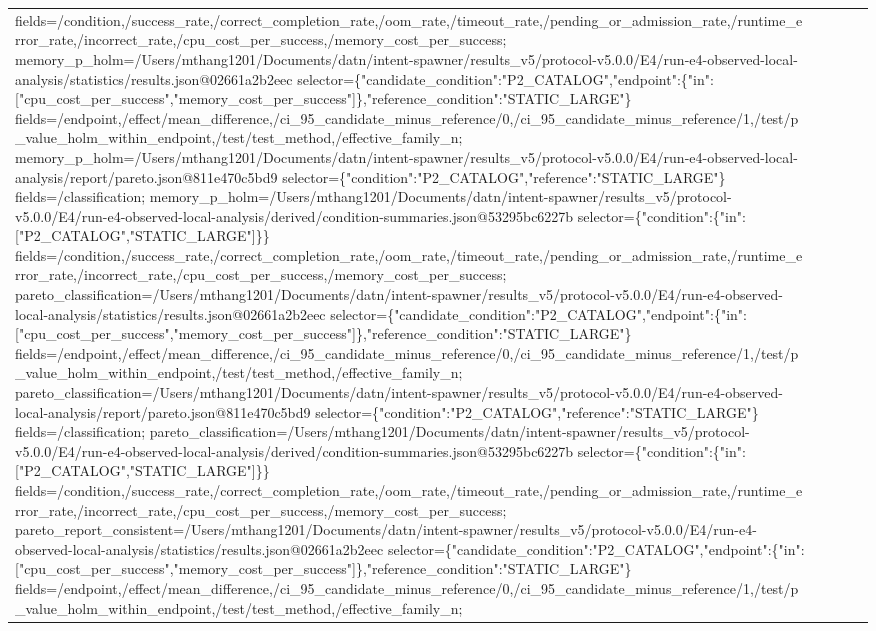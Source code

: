 \begin{tabular}{lllll}
fields=/condition,/success\_rate,/correct\_completion\_rate,/oom\_rate,/timeout\_rate,/pending\_or\_admission\_rate,/runtime\_error\_rate,/incorrect\_rate,/cpu\_cost\_per\_success,/memory\_cost\_per\_success; memory\_p\_holm=/Users/mthang1201/Documents/datn/intent-spawner/results\_v5/protocol-v5.0.0/E4/run-e4-observed-local-analysis/statistics/results.json@02661a2b2eec selector=\{"candidate\_condition":"P2\_CATALOG","endpoint":\{"in":["cpu\_cost\_per\_success","memory\_cost\_per\_success"]\},"reference\_condition":"STATIC\_LARGE"\} fields=/endpoint,/effect/mean\_difference,/ci\_95\_candidate\_minus\_reference/0,/ci\_95\_candidate\_minus\_reference/1,/test/p\_value\_holm\_within\_endpoint,/test/test\_method,/effective\_family\_n; memory\_p\_holm=/Users/mthang1201/Documents/datn/intent-spawner/results\_v5/protocol-v5.0.0/E4/run-e4-observed-local-analysis/report/pareto.json@811e470c5bd9 selector=\{"condition":"P2\_CATALOG","reference":"STATIC\_LARGE"\} fields=/classification; memory\_p\_holm=/Users/mthang1201/Documents/datn/intent-spawner/results\_v5/protocol-v5.0.0/E4/run-e4-observed-local-analysis/derived/condition-summaries.json@53295bc6227b selector=\{"condition":\{"in":["P2\_CATALOG","STATIC\_LARGE"]\}\} fields=/condition,/success\_rate,/correct\_completion\_rate,/oom\_rate,/timeout\_rate,/pending\_or\_admission\_rate,/runtime\_error\_rate,/incorrect\_rate,/cpu\_cost\_per\_success,/memory\_cost\_per\_success; pareto\_classification=/Users/mthang1201/Documents/datn/intent-spawner/results\_v5/protocol-v5.0.0/E4/run-e4-observed-local-analysis/statistics/results.json@02661a2b2eec selector=\{"candidate\_condition":"P2\_CATALOG","endpoint":\{"in":["cpu\_cost\_per\_success","memory\_cost\_per\_success"]\},"reference\_condition":"STATIC\_LARGE"\} fields=/endpoint,/effect/mean\_difference,/ci\_95\_candidate\_minus\_reference/0,/ci\_95\_candidate\_minus\_reference/1,/test/p\_value\_holm\_within\_endpoint,/test/test\_method,/effective\_family\_n; pareto\_classification=/Users/mthang1201/Documents/datn/intent-spawner/results\_v5/protocol-v5.0.0/E4/run-e4-observed-local-analysis/report/pareto.json@811e470c5bd9 selector=\{"condition":"P2\_CATALOG","reference":"STATIC\_LARGE"\} fields=/classification; pareto\_classification=/Users/mthang1201/Documents/datn/intent-spawner/results\_v5/protocol-v5.0.0/E4/run-e4-observed-local-analysis/derived/condition-summaries.json@53295bc6227b selector=\{"condition":\{"in":["P2\_CATALOG","STATIC\_LARGE"]\}\} fields=/condition,/success\_rate,/correct\_completion\_rate,/oom\_rate,/timeout\_rate,/pending\_or\_admission\_rate,/runtime\_error\_rate,/incorrect\_rate,/cpu\_cost\_per\_success,/memory\_cost\_per\_success; pareto\_report\_consistent=/Users/mthang1201/Documents/datn/intent-spawner/results\_v5/protocol-v5.0.0/E4/run-e4-observed-local-analysis/statistics/results.json@02661a2b2eec selector=\{"candidate\_condition":"P2\_CATALOG","endpoint":\{"in":["cpu\_cost\_per\_success","memory\_cost\_per\_success"]\},"reference\_condition":"STATIC\_LARGE"\} fields=/endpoint,/effect/mean\_difference,/ci\_95\_candidate\_minus\_reference/0,/ci\_95\_candidate\_minus\_reference/1,/test/p\_value\_holm\_within\_endpoint,/test/test\_method,/effective\_family\_n; 
\end{tabular}
